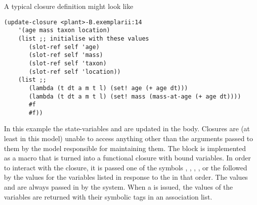A typical closure definition might look like
\begin{verbatim}
(update-closure <plant>-B.exemplarii:14 
    '(age mass taxon location)
    (list ;; initialise with these values
       (slot-ref self 'age)
       (slot-ref self 'mass)
       (slot-ref self 'taxon)
       (slot-ref self 'location))
    (list ;; 
       (lambda (t dt a m t l) (set! age (+ age dt)))
       (lambda (t dt a m t l) (set! mass (mass-at-age (+ age dt))))
       #f
       #f))

\end{verbatim}
In this example the state-variables  and 
are updated in the body.  Closures are (at least in this model) unable
to access anything other than the arguments passed to them by the
model responsible for maintaining them.  The 
block is implemented as a macro that is turned into a functional
closure with bound variables.  In order to interact with the closure,
it is passed one of the
symbols , ,
, ,  or the
 followed by the values for the variables
listed in response to the  in that order.  The
values  and  are always passed in by the
system.  When a  is issued, the values of the variables
are returned with their symbolic tags in an association list.





